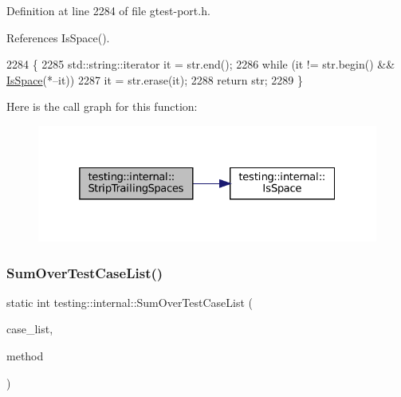 Definition at line 2284 of file gtest-\/port.\+h.



References Is\+Space().


\begin{DoxyCode}
2284                                                     \{
2285   std::string::iterator it = str.end();
2286   \textcolor{keywordflow}{while} (it != str.begin() && \hyperlink{namespacetesting_1_1internal_af429e04f70f9c10f6aa76a5d1ccd389f}{IsSpace}(*--it))
2287     it = str.erase(it);
2288   \textcolor{keywordflow}{return} str;
2289 \}
\end{DoxyCode}
Here is the call graph for this function\+:
\nopagebreak
\begin{figure}[H]
\begin{center}
\leavevmode
\includegraphics[width=325pt]{namespacetesting_1_1internal_aa6afda12e567c353e2e9b9c2e8cae14f_cgraph}
\end{center}
\end{figure}
\mbox{\label{namespacetesting_1_1internal_a564f9e608c608736ebe2199ab831745b}} 
\subsubsection{\texorpdfstring{Sum\+Over\+Test\+Case\+List()}{SumOverTestCaseList()}}
{\footnotesize\ttfamily static int testing\+::internal\+::\+Sum\+Over\+Test\+Case\+List (\begin{DoxyParamCaption}\item[{const std\+::vector$<$ \hyperlink{classtesting_1_1TestCase}{Test\+Case} $\ast$$>$ \&}]{case\+\_\+list,  }\item[{int(Test\+Case\+::$\ast$)() const}]{method }\end{DoxyParamCaption})\hspace{0.3cm}{\ttfamily [static]}}



